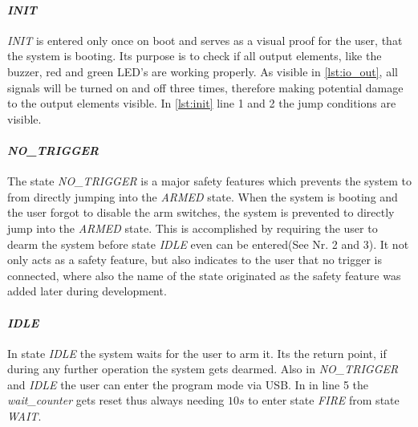 

\paragraph{\textit{INIT}}
\textit{INIT} is entered only once on boot and serves as a visual proof for the user, that the system is booting. Its purpose is to check if all output elements, like the buzzer, red and green LED's are working properly. As visible in \cref{lst:io_out}, all signals will be turned on and off three times, therefore making potential damage to the output elements  visible. In \cref{lst:init} line 1 and 2 the jump conditions are visible.\\




\paragraph{\textit{NO\_TRIGGER}}
The state \textit{NO\_TRIGGER} is a major safety features which prevents the system to from directly jumping into the \textit{ARMED} state. When the system is booting and the user forgot to disable the arm switches, the system is prevented to directly jump into the \textit{ARMED} state. This is accomplished by requiring the user to dearm the system before state \textit{IDLE} even can be entered(See  Nr. 2 and 3). It not only acts as a safety feature, but also indicates to the user that no trigger is connected, where also the name of the state originated as the safety feature was added later during development. \\



\pagebreak

\paragraph{\textit{IDLE}}
In state \textit{IDLE} the system waits for the user to arm it. Its the return point, if during any further operation the system gets dearmed. Also in \textit{NO\_TRIGGER} and \textit{IDLE} the user can enter the program mode via USB. In  in line 5 the \textit{wait\_counter} gets reset thus always needing $10s$ to enter state \textit{FIRE} from state \textit{WAIT}.\\

